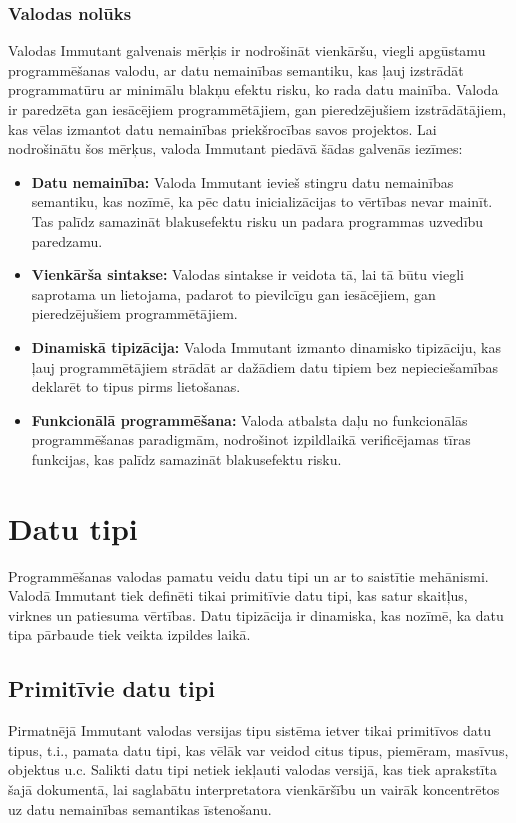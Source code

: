 \documentclass[12pt,a4paper]{report}
\begin{document}
\subsubsection{Valodas nolūks}
Valodas Immutant galvenais mērķis ir nodrošināt vienkāršu, viegli apgūstamu programmēšanas valodu, ar datu nemainības semantiku, kas ļauj izstrādāt programmatūru ar minimālu blakņu efektu risku, ko rada datu mainība. Valoda ir paredzēta gan iesācējiem programmētājiem, gan pieredzējušiem izstrādātājiem, kas vēlas izmantot datu nemainības priekšrocības savos projektos. Lai nodrošinātu šos mērķus, valoda Immutant piedāvā šādas galvenās iezīmes:
\begin{itemize}
  \item \textbf{Datu nemainība:} Valoda Immutant ievieš stingru datu nemainības semantiku, kas nozīmē, ka pēc datu inicializācijas to vērtības nevar mainīt. Tas palīdz samazināt blakusefektu risku un padara programmas uzvedību paredzamu.
  \item \textbf{Vienkārša sintakse:} Valodas sintakse ir veidota tā, lai tā būtu viegli saprotama un lietojama, padarot to pievilcīgu gan iesācējiem, gan pieredzējušiem programmētājiem.
  \item \textbf{Dinamiskā tipizācija:} Valoda Immutant izmanto dinamisko tipizāciju, kas ļauj programmētājiem strādāt ar dažādiem datu tipiem bez nepieciešamības deklarēt to tipus pirms lietošanas.
  \item \textbf{Funkcionālā programmēšana:} Valoda atbalsta daļu no funkcionālās programmēšanas paradigmām, nodrošinot izpildlaikā verificējamas tīras funkcijas, kas palīdz samazināt blakusefektu risku.
\end{itemize}

\section{Datu tipi}

Programmēšanas valodas pamatu veidu datu tipi un ar to saistītie mehānismi. Valodā Immutant tiek definēti tikai primitīvie datu tipi, kas satur skaitļus, virknes un patiesuma vērtības. Datu tipizācija ir dinamiska, kas nozīmē, ka datu tipa pārbaude tiek veikta izpildes laikā.

\subsection{Primitīvie datu tipi}

Pirmatnējā Immutant valodas versijas tipu sistēma ietver tikai primitīvos datu tipus, t.i., pamata datu tipi, kas vēlāk var veidod citus tipus, piemēram, masīvus, objektus u.c.  Salikti datu tipi netiek iekļauti valodas versijā, kas tiek aprakstīta šajā dokumentā, lai saglabātu interpretatora vienkāršību un vairāk koncentrētos uz datu nemainības semantikas īstenošanu.
\end{document}

